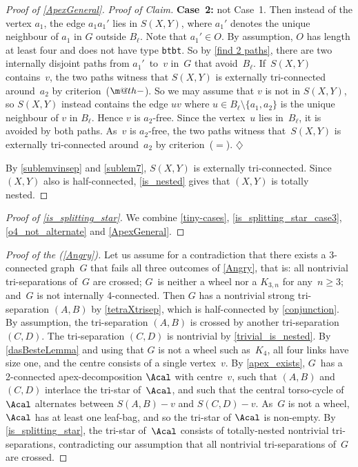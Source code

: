 \documentclass{aic}
\makeatletter
\newenvironment{cproof}{\noindent\textit{Proof of Claim.}}{\phantom{!}\!\hfill$\diamondsuit$}
\theoremstyle{plain}
\theoremstyle{definition}
\theoremstyle{plain}
\newcommand{\dotminus}{\mathbin{\text{\@dotminus}}}
\newcommand{\@dotminus}{%
  \ooalign{\hidewidth\raise1.2ex\hbox{.}\hidewidth\cr$\m@th-$\cr}%
}
\theoremstyle{plain}
\newcommand{\sm}{\setminus}
\renewcommand{\ge}{\geqslant}
\newcommand{\ty}[1]{{\tt#1}}
\makeatother
\begin{document}
\begin{proof}[Proof of \autoref{ApexGeneral}]
\begin{cproof}
{\bf Case~2:} not Case~1.
Then instead of the vertex $a_1$, the edge $a_1 a_1'$ lies in $S(X,Y)$, where $a_1'$ denotes the unique neighbour of $a_1$ in $G$ outside $B_\ell$.
Note that $a_1'\in O$.
By assumption, $O$ has length at least four and does not have type \ty{btbt}.
So by \autoref{find 2 paths},
there are two internally 
disjoint paths from $a_1'$~to~$v$ in~$G$ that avoid~$B_\ell$.
If~$S(X,Y)$ contains~$v$, the two paths witness that $S(X,Y)$ is externally tri-connected around~$a_2$ by criterion~($\dotminus$).
So we may assume that $v$ is not in $S(X,Y)$, so $S(X,Y)$ instead contains the edge $uv$ where $u\in B_\ell\sm\{a_1,a_2\}$ is the unique neighbour of $v$ in $B_\ell$.
Hence $v$ is $a_2$-free.
Since the vertex~$u$ lies in~$B_\ell$, it is avoided by both paths.
As~$v$ is $a_2$-free, the two paths witness that~$S(X,Y)$ is externally tri-connected around~$a_2$ by criterion~($=$).
\end{cproof}\medskip

By \autoref{sublemvinsep} and \autoref{sublem7}, $S(X,Y)$ is externally tri-connected.
Since $(X,Y)$ also is half-connected, \autoref{is_nested} gives that $(X,Y)$ is totally nested.
\end{proof}

\begin{proof}[Proof of \autoref{is_splitting_star}]
We combine \autoref{tiny-cases}, \autoref{is_splitting_star_case3}, \autoref{o4_not_alternate} and \autoref{ApexGeneral}.
\end{proof}


\begin{proof}[Proof of the  (\ref{Angry})]
Let us assume for a contradiction that there exists a 3-connected graph~$G$ that fails all three outcomes of \autoref{Angry}, that is: all nontrivial tri-separations of~$G$ are crossed; $G$~is neither a wheel nor a $K_{3,n}$ for any~$n\ge 3$; and~$G$ is not internally 4-connected.
Then $G$ has a nontrivial strong tri-separation $(A,B)$ by \autoref{tetraXtrisep}, which is half-connected by \autoref{conjunction}.
By assumption, the tri-separation $(A,B)$ is crossed by another tri-separation $(C,D)$.
The tri-separation $(C,D)$ is nontrivial by \autoref{trivial_is_nested}.
By \autoref{dasBesteLemma} and using that $G$ is not a wheel such as~$K_4$, all four links have size one, and the centre consists of a single vertex~$v$.
By \autoref{apex_exists}, $G$~has a 2-connected apex-decomposition $\Acal$ with centre~$v$, such that $(A,B)$ and $(C,D)$ interlace the tri-star of~$\Acal$, and such that the central torso-cycle of~$\Acal$ alternates between $S(A,B)-v$ and $S(C,D)-v$.
As~$G$ is not a wheel, $\Acal$ has at least one leaf-bag, and so the tri-star of $\Acal$ is non-empty.
By \autoref{is_splitting_star}, the tri-star of~$\Acal$ consists of totally-nested nontrivial tri-separations, contradicting our assumption that all nontrivial tri-separations of~$G$ are crossed.
\end{proof}
\end{document}
